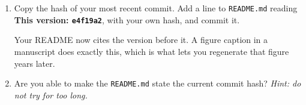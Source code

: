 \documentclass[
  letterpaper,
  DIV=11,
  numbers=noendperiod]{scrartcl}
\begin{document}
\begin{enumerate}
\def\labelenumi{\roman{enumi}.}
\item
  Copy the hash of your most recent commit. Add a line to
  \texttt{README.md} reading \textbf{This version: \texttt{e4f19a2}},
  with your own hash, and commit it.

  Your README now cites the version before it. A figure caption in a
  manuscript does exactly this, which is what lets you regenerate that
  figure years later.
\item
  Are you able to make the \texttt{README.md} state the current commit
  hash? \emph{Hint: do not try for too long.}
\end{enumerate}
\end{document}
